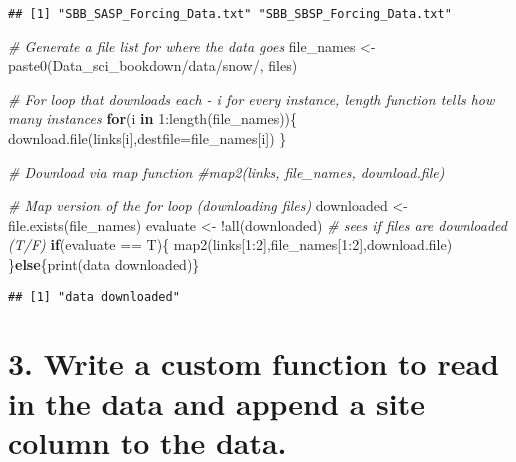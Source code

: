 \documentclass[
]{book}
\newenvironment{Shaded}{\begin{snugshade}}{\end{snugshade}}
\newcommand{\AttributeTok}[1]{\textcolor[rgb]{0.77,0.63,0.00}{#1}}
\newcommand{\CommentTok}[1]{\textcolor[rgb]{0.56,0.35,0.01}{\textit{#1}}}
\newcommand{\ControlFlowTok}[1]{\textcolor[rgb]{0.13,0.29,0.53}{\textbf{#1}}}
\newcommand{\DecValTok}[1]{\textcolor[rgb]{0.00,0.00,0.81}{#1}}
\newcommand{\FunctionTok}[1]{\textcolor[rgb]{0.00,0.00,0.00}{#1}}
\newcommand{\NormalTok}[1]{#1}
\newcommand{\OtherTok}[1]{\textcolor[rgb]{0.56,0.35,0.01}{#1}}
\newcommand{\SpecialCharTok}[1]{\textcolor[rgb]{0.00,0.00,0.00}{#1}}
\newcommand{\StringTok}[1]{\textcolor[rgb]{0.31,0.60,0.02}{#1}}
\begin{document}
\begin{verbatim}
## [1] "SBB_SASP_Forcing_Data.txt" "SBB_SBSP_Forcing_Data.txt"
\end{verbatim}

\begin{Shaded}
\begin{Highlighting}[]
\CommentTok{\# Generate a file list for where the data goes}
\NormalTok{file\_names }\OtherTok{\textless{}{-}} \FunctionTok{paste0}\NormalTok{(}\StringTok{\textquotesingle{}Data\_sci\_bookdown/data/snow/\textquotesingle{}}\NormalTok{, files)}

\CommentTok{\# For loop that downloads each {-} i for every instance, length function tells how many instances}
\ControlFlowTok{for}\NormalTok{(i }\ControlFlowTok{in} \DecValTok{1}\SpecialCharTok{:}\FunctionTok{length}\NormalTok{(file\_names))\{}
  \FunctionTok{download.file}\NormalTok{(links[i],}\AttributeTok{destfile=}\NormalTok{file\_names[i])}
\NormalTok{\}}

\CommentTok{\# Download via map function}
\CommentTok{\#map2(links, file\_names, download.file)}

\CommentTok{\# Map version of the for loop (downloading files)}
\NormalTok{downloaded }\OtherTok{\textless{}{-}} \FunctionTok{file.exists}\NormalTok{(file\_names) }
\NormalTok{evaluate }\OtherTok{\textless{}{-}} \SpecialCharTok{!}\FunctionTok{all}\NormalTok{(downloaded) }\CommentTok{\# sees if files are downloaded (T/F)}
\ControlFlowTok{if}\NormalTok{(evaluate }\SpecialCharTok{==}\NormalTok{ T)\{}
  \FunctionTok{map2}\NormalTok{(links[}\DecValTok{1}\SpecialCharTok{:}\DecValTok{2}\NormalTok{],file\_names[}\DecValTok{1}\SpecialCharTok{:}\DecValTok{2}\NormalTok{],download.file)}
\NormalTok{\}}\ControlFlowTok{else}\NormalTok{\{}\FunctionTok{print}\NormalTok{(}\StringTok{\textquotesingle{}data downloaded\textquotesingle{}}\NormalTok{)\}}
\end{Highlighting}
\end{Shaded}

\begin{verbatim}
## [1] "data downloaded"
\end{verbatim}

\hypertarget{write-a-custom-function-to-read-in-the-data-and-append-a-site-column-to-the-data.}{%
\section{3. Write a custom function to read in the data and append a site column to the data.}\label{write-a-custom-function-to-read-in-the-data-and-append-a-site-column-to-the-data.}}
\end{document}
